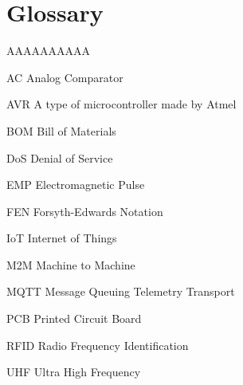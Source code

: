 \chapter*{Glossary}

\begin{labeling}{AAAAAAAAAA}
\item[AC]  Analog Comparator
\item[AVR] A type of microcontroller made by Atmel
\item[BOM] Bill of Materials
\item[DoS] Denial of Service
\item[EMP] Electromagnetic Pulse
\item[FEN] Forsyth-Edwards Notation
\item[IoT] Internet of Things
\item[M2M] Machine to Machine
\item[MQTT] Message Queuing Telemetry Transport
\item[PCB] Printed Circuit Board
\item[RFID] Radio Frequency Identification
\item[UHF] Ultra High Frequency


 




\end{labeling}




